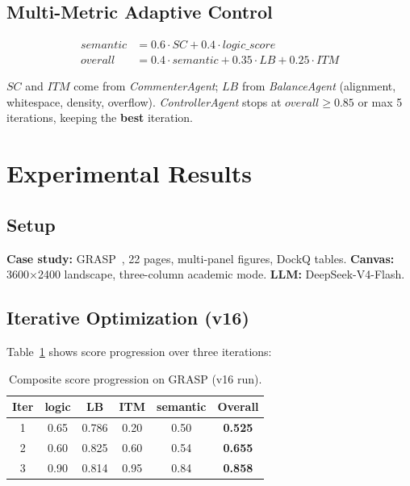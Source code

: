 \documentclass{article}
\begin{document}
\subsection{Multi-Metric Adaptive Control}

\begin{align}
  \mathit{semantic} &= 0.6 \cdot SC + 0.4 \cdot \mathit{logic\_score} \\
  \mathit{overall} &= 0.4 \cdot \mathit{semantic} + 0.35 \cdot LB + 0.25 \cdot ITM
\end{align}

$SC$ and $ITM$ come from \emph{CommenterAgent}; $LB$ from \emph{BalanceAgent} (alignment, whitespace, density, overflow). \emph{ControllerAgent} stops at $\mathit{overall} \geq 0.85$ or max 5 iterations, keeping the \textbf{best} iteration.

\section{Experimental Results}
\label{sec:experiments}

\subsection{Setup}

\textbf{Case study:} GRASP~\citep{zhang2025grasp}, 22 pages, multi-panel figures, DockQ tables. \textbf{Canvas:} 3600$\times$2400 landscape, three-column academic mode. \textbf{LLM:} DeepSeek-V4-Flash.

\subsection{Iterative Optimization (v16)}

Table~\ref{tab:scores} shows score progression over three iterations:

\begin{table}[t]
  \centering
  \caption{Composite score progression on GRASP (v16 run).}
  \label{tab:scores}
  \small
  \begin{tabular}{cccccc}
    \toprule
    Iter & logic & LB & ITM & semantic & \textbf{Overall} \\
    \midrule
    1 & 0.65 & 0.786 & 0.20 & 0.50 & \textbf{0.525} \\
    2 & 0.60 & 0.825 & 0.60 & 0.54 & \textbf{0.655} \\
    3 & 0.90 & 0.814 & 0.95 & 0.84 & \textbf{0.858} \\
    \bottomrule
  \end{tabular}
\end{table}
\end{document}

